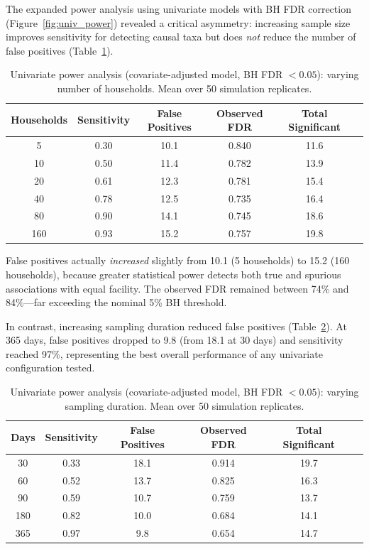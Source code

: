 \documentclass[11pt,letterpaper]{article}
\begin{document}
The expanded power analysis using univariate models with BH FDR correction (Figure~\ref{fig:univ_power}) revealed a critical asymmetry: increasing sample size improves sensitivity for detecting causal taxa but does \emph{not} reduce the number of false positives (Table~\ref{tab:univ_power_hh}).

\begin{table}[H]
\centering
\caption{Univariate power analysis (covariate-adjusted model, BH FDR $< 0.05$): varying number of households. Mean over 50 simulation replicates.}
\label{tab:univ_power_hh}
\begin{tabular}{@{}cccccc@{}}
\toprule
Households & Sensitivity & False Positives & Observed FDR & Total Significant \\
\midrule
5   & 0.30 & 10.1 & 0.840 & 11.6 \\
10  & 0.50 & 11.4 & 0.782 & 13.9 \\
20  & 0.61 & 12.3 & 0.781 & 15.4 \\
40  & 0.78 & 12.5 & 0.735 & 16.4 \\
80  & 0.90 & 14.1 & 0.745 & 18.6 \\
160 & 0.93 & 15.2 & 0.757 & 19.8 \\
\bottomrule
\end{tabular}
\end{table}

False positives actually \emph{increased} slightly from 10.1 (5 households) to 15.2 (160 households), because greater statistical power detects both true and spurious associations with equal facility. The observed FDR remained between 74\% and 84\%---far exceeding the nominal 5\% BH threshold.

In contrast, increasing sampling duration reduced false positives (Table~\ref{tab:univ_power_days}). At 365 days, false positives dropped to 9.8 (from 18.1 at 30 days) and sensitivity reached 97\%, representing the best overall performance of any univariate configuration tested.

\begin{table}[H]
\centering
\caption{Univariate power analysis (covariate-adjusted model, BH FDR $< 0.05$): varying sampling duration. Mean over 50 simulation replicates.}
\label{tab:univ_power_days}
\begin{tabular}{@{}cccccc@{}}
\toprule
Days & Sensitivity & False Positives & Observed FDR & Total Significant \\
\midrule
30  & 0.33 & 18.1 & 0.914 & 19.7 \\
60  & 0.52 & 13.7 & 0.825 & 16.3 \\
90  & 0.59 & 10.7 & 0.759 & 13.7 \\
180 & 0.82 & 10.0 & 0.684 & 14.1 \\
365 & 0.97 & 9.8  & 0.654 & 14.7 \\
\bottomrule
\end{tabular}
\end{table}
\end{document}
